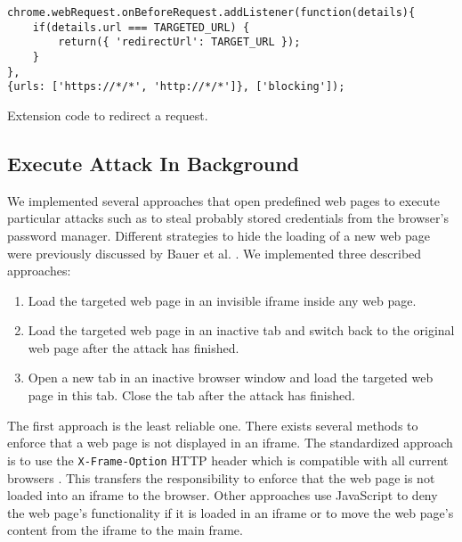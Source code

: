 	\begin{code}
		\begin{lstlisting}
chrome.webRequest.onBeforeRequest.addListener(function(details){
	if(details.url === TARGETED_URL) {	
		return({ 'redirectUrl': TARGET_URL });
	}
},
{urls: ['https://*/*', 'http://*/*']}, ['blocking']);	
\end{lstlisting}
		\caption{Extension code to redirect a request.}
		\label{code:redirectRequest}
	\end{code}
	
	
\subsection{Execute Attack In Background}
\label{sec:executeAttackInBackground}

	We implemented several approaches that open predefined web pages to execute particular attacks such as to steal probably stored credentials from the browser's password manager. Different strategies to hide the loading of a new web page were previously discussed by Bauer et al. \cite{extensions:cns14}. We implemented three described approaches:
	
	\begin{enumerate}
		\item Load the targeted web page in an invisible iframe inside any web page.
		\item Load the targeted web page in an inactive tab and switch back to the original web page after the attack has finished.
		\item Open a new tab in an inactive browser window and load the targeted web page in this tab. Close the tab after the attack has finished.
	\end{enumerate} 
	
	The first approach is the least reliable one. There exists several methods to enforce that a web page is not displayed in an iframe. The standardized approach is to use the \texttt{X-Frame-Option} HTTP header which is compatible with all current browsers \cite{xFrameOptionsSpezification, xFrameOptionsCompability}. This transfers the responsibility to enforce that the web page is not loaded into an iframe to the browser. Other approaches use JavaScript to deny the web page's functionality if it is loaded in an iframe or to move the web page's content from the iframe to the main frame.
		
